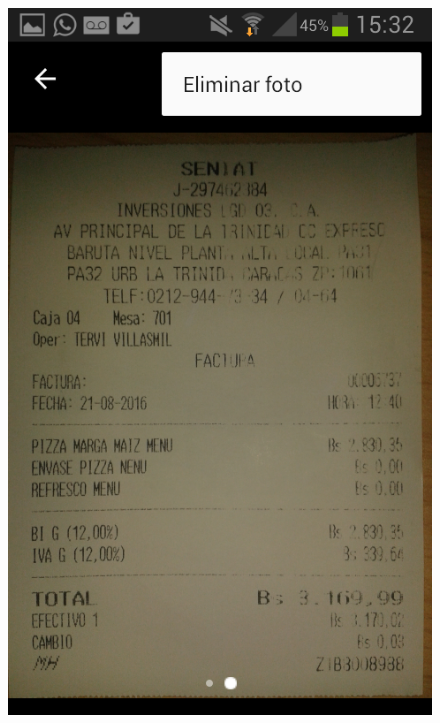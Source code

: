 \begin{figure}[ht]
\begin{minipage}{.5\textwidth}
  \includegraphics[scale=0.30,type=png,ext=.png,read=.png]{imagenes/Screenshots/photo_view2}
  \captionsetup{justification=centering}
  \label{fig:interfazEliminarFoto}
\end{minipage}
\end{figure}

